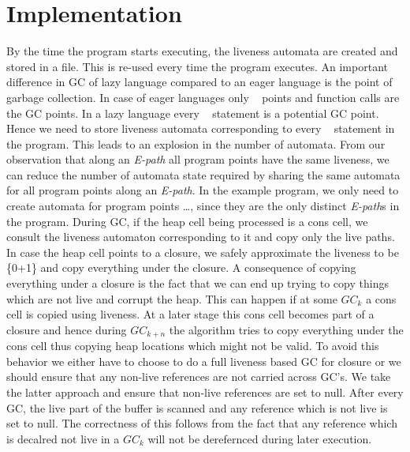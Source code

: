 \documentclass[10pt]{sigplanconf}
\begin{document}
\section{Implementation}
By the  time the program  starts executing, the liveness  automata are
created and stored in a file.   This is re-used every time the program
executes.
An important  difference in GC of  lazy language compared  to an eager
language  is  the  point  of  garbage collection.  In  case  of  eager
languages only \CONS~ points and  function calls are the GC points. In
a lazy language  every \LET~ statement is a  potential GC point. Hence
we  need  to store  liveness  automata  corresponding  to every  \LET~
statement in the program. This leads  to an explosion in the number of
automata. From our observation that  along an {\em E-path} all program
points have  the same liveness, we  can reduce the  number of automata
state required  by sharing  the same automata  for all  program points
along an {\em E-path}. In the  example program, we only need to create
automata for program  points \ldots, since they are  the only distinct
{\em E-path}s in the program.
During GC, if the heap cell being processed is a cons cell, we consult
the  liveness automaton  corresponding to  it and  copy only  the live
paths.  In  case  the  heap  cell  points  to  a  closure,  we  safely
approximate the  liveness to be {\{0+1\}\*} and  copy everything under
the closure.
A consequence of  copying everything under a closure  is the fact that
we can end up trying to copy things which are not live and corrupt the
heap. This  can happen if at some  $GC_k$ a cons cell  is copied using
liveness. At  a later stage this  cons cell becomes part  of a closure
and  hence during $GC_{k+n}$  the algorithm  tries to  copy everything
under the  cons cell  thus copying heap  locations which might  not be
valid.  To avoid  this behavior we either have to choose  to do a full
liveness based  GC for closure or  we should ensure  that any non-live
references are  not carried across  GC's. We take the  latter approach
and ensure that  non-live references are set to  null. After every GC,
the live part of the buffer  is scanned and any reference which is not
live is  set to null.  The correctness of  this follows from  the fact
that any reference which is decalred  not live in a $GC_k$ will not be
derefernced during later execution.
\end{document}

